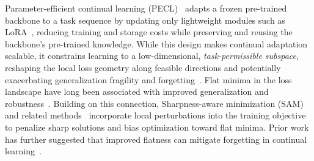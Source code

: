 \documentclass{article}
\theoremstyle{plain}
\theoremstyle{definition}
\theoremstyle{remark}
\begin{document}
Parameter-efficient continual learning (PECL)~\cite{Gao_2023_ICCV,qiaoLearnMoreBother2024} adapts a frozen pre-trained backbone to a task sequence by updating only lightweight modules such as LoRA~\cite{hu_lora_2021}, reducing training and storage costs while preserving and reusing the backbone’s pre-trained knowledge. While this design makes continual adaptation scalable, it constrains learning to a low-dimensional, \emph{task-permissible subspace}, reshaping the local loss geometry along feasible directions and potentially exacerbating generalization fragility and forgetting~\cite{NEURIPS2024_4eb2c0ad,li2024flatlora}.
Flat minima in the loss landscape have long been associated with improved generalization and robustness~\citep{FlatMinima1997,wu2017understandinggeneralizationdeeplearning}. 
Building on this connection, Sharpness-aware minimization (SAM)~\cite{foretSharpnessAwareMinimizationEfficiently2021} and related methods~\citep{pmlr-v151-bisla22a,Zhang_GAM,NEURIPS2024_C-Flat} incorporate local perturbations into the training objective to penalize sharp solutions and bias optimization toward flat minima.
Prior work has further suggested that improved flatness can mitigate forgetting in continual learning~\citep{NEURIPS2020_518a38cc,JMLRAnEmpiricalInvestigatio,liRevisitingCatastrophicForgetting2024}.









\end{document}
